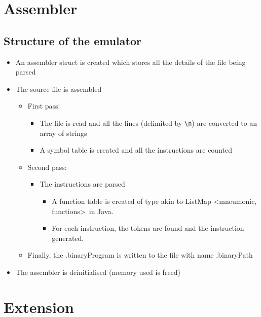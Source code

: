 \documentclass[11pt]{article}
\begin{document}
\section{Assembler}

\subsection{Structure of the emulator}

\begin{itemize}

    \item An assembler struct is created which stores all the details of the file being parsed
    \item The source file is assembled
    
    \begin{itemize}
    
        \item First pass:
        
        \begin{itemize}
        
            \item The file is read and all the lines (delimited by \texttt{\textbackslash n}) are converted to an array of strings
            \item A symbol table is created and all the instructions are counted
            
        \end{itemize}
        
        \item Second pass:
        
        \begin{itemize}
        
            \item The instructions are parsed 
            
            \begin{itemize}
        
                \item A function table is created of type akin to ListMap \textless mneumonic, functions\textgreater\ in Java.
                \item For each instruction, the tokens are found and the instruction generated.
            
            \end{itemize}
            
        \end{itemize}
    
        
        \item Finally, the .binaryProgram is written to the file with name .binaryPath
    
    \end{itemize}
    
    \item The assembler is deinitialised (memory used is freed)

\end{itemize}

\section{Extension}
\end{document}
